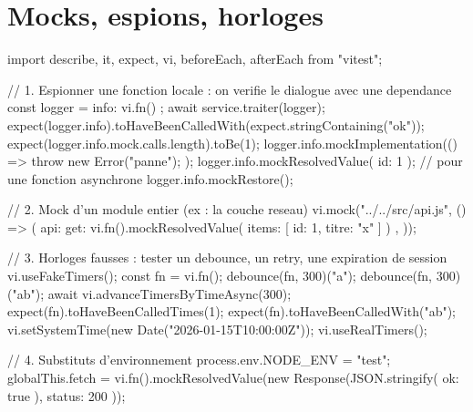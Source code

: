 
\section{Mocks, espions, horloges}

\begin{codejs}
import { describe, it, expect, vi, beforeEach, afterEach } from "vitest";

// 1. Espionner une fonction locale : on verifie le dialogue avec une dependance
const logger = { info: vi.fn() };
await service.traiter(logger);
expect(logger.info).toHaveBeenCalledWith(expect.stringContaining("ok"));
expect(logger.info.mock.calls.length).toBe(1);
logger.info.mockImplementation(() => { throw new Error("panne"); });
logger.info.mockResolvedValue({ id: 1 });       // pour une fonction asynchrone
logger.info.mockRestore();

// 2. Mock d'un module entier (ex : la couche reseau)
vi.mock("../../src/api.js", () => ({
  api: { get: vi.fn().mockResolvedValue({ items: [{ id: 1, titre: "x" }] }) },
}));

// 3. Horloges fausses : tester un debounce, un retry, une expiration de session
vi.useFakeTimers();
const fn = vi.fn();
debounce(fn, 300)("a"); debounce(fn, 300)("ab");
await vi.advanceTimersByTimeAsync(300);
expect(fn).toHaveBeenCalledTimes(1);
expect(fn).toHaveBeenCalledWith("ab");
vi.setSystemTime(new Date("2026-01-15T10:00:00Z"));
vi.useRealTimers();

// 4. Substituts d'environnement
process.env.NODE_ENV = "test";
globalThis.fetch = vi.fn().mockResolvedValue(new Response(JSON.stringify({ ok: true }), { status: 200 }));
\end{codejs}

